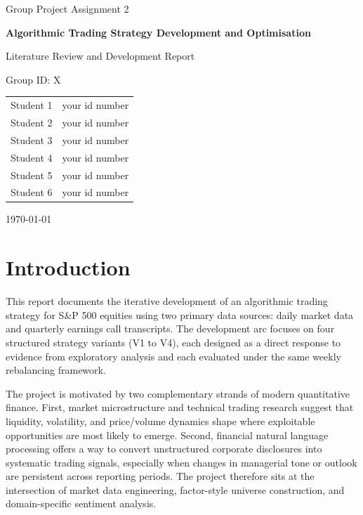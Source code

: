 \documentclass[11pt,twoside,a4paper]{article}
\newcommand{\reporttitle}{Algorithmic Trading Strategy Development and Optimisation}
\newcommand{\gid}{X}
\newcommand{\reportauthorOne}{Student 1}
\newcommand{\cidOne}{your id number}
\newcommand{\reportauthorTwo}{Student 2}
\newcommand{\cidTwo}{your id number}
\newcommand{\reportauthorThree}{Student 3}
\newcommand{\cidThree}{your id number}
\newcommand{\reportauthorFour}{Student 4}
\newcommand{\cidFour}{your id number}
\newcommand{\reportauthorFive}{Student 5}
\newcommand{\cidFive}{your id number}
\newcommand{\reportauthorSix}{Student 6}
\newcommand{\cidSix}{your id number}
\newcommand{\reporttype}{Group Project Assignment 2}
\begin{document}
\begin{titlepage}
    \centering
    {\Large \reporttype \par}
    \vspace{1.5cm}
    {\huge \bfseries \reporttitle \par}
    \vspace{1cm}
    {\Large Literature Review and Development Report\par}
    \vspace{1.5cm}
    {\large Group ID: \gid \par}
    \vfill
    \begin{tabular}{ll}
        \reportauthorOne & \cidOne \\
        \reportauthorTwo & \cidTwo \\
        \reportauthorThree & \cidThree \\
        \reportauthorFour & \cidFour \\
        \reportauthorFive & \cidFive \\
        \reportauthorSix & \cidSix \\
    \end{tabular}
    \vfill
    {\large \today\par}
\end{titlepage}

\tableofcontents
\newpage

\section{Introduction}
This report documents the iterative development of an algorithmic trading strategy for S\&P 500 equities using two primary data sources: daily market data and quarterly earnings call transcripts. The development arc focuses on four structured strategy variants (V1 to V4), each designed as a direct response to evidence from exploratory analysis and each evaluated under the same weekly rebalancing framework.

The project is motivated by two complementary strands of modern quantitative finance. First, market microstructure and technical trading research suggest that liquidity, volatility, and price/volume dynamics shape where exploitable opportunities are most likely to emerge. Second, financial natural language processing offers a way to convert unstructured corporate disclosures into systematic trading signals, especially when changes in managerial tone or outlook are persistent across reporting periods. The project therefore sits at the intersection of market data engineering, factor-style universe construction, and domain-specific sentiment analysis.
\end{document}
